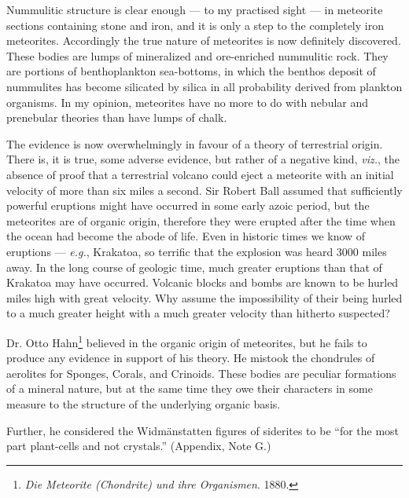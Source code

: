 \documentclass[a4paper, 12pt, oneside]{article}
\begin{document}
Nummulitic structure is clear enough --- to my practised sight --- in meteorite sections containing stone and iron, and it is only a step to the completely iron meteorites. Accordingly the true nature of meteorites is now definitely discovered. These bodies are lumps of mineralized and ore-enriched nummulitic rock. They are portions of benthoplankton sea-bottoms, in which the benthos deposit of nummulites has become silicated by silica in all probability derived from plankton organisms. In my opinion, meteorites have no more to do with nebular and prenebular theories than have lumps of chalk.

The evidence is now overwhelmingly in favour of a theory of terrestrial origin. There is, it is true, some adverse evidence, but rather of a negative kind, \emph{viz.}, the absence of proof that a terrestrial volcano could eject a meteorite with an initial velocity of more than six miles a second. Sir Robert Ball assumed that sufficiently powerful eruptions might have occurred in some early azoic period, but the meteorites are of organic origin, therefore they were erupted after the time when the ocean had become the abode of life. Even in historic times we know of eruptions --- \emph{e.g.}, Krakatoa, so terrific that the explosion was heard 3000 miles away. In the long course of geologic time, much greater eruptions than that of Krakatoa may have occurred. Volcanic blocks and bombs are known to be hurled miles high with great velocity. Why assume the impossibility of their being hurled to a much greater height with a much greater velocity than hitherto suspected?

Dr. Otto Hahn\footnote{\emph{Die Meteorite (Chondrite) und ihre Organismen}. 1880.} believed in the organic origin of meteorites, but he fails to produce any evidence in support of his theory. He mistook the chondrules of aerolites for Sponges, Corals, and Crinoids. These bodies are peculiar formations of a mineral nature, but at the same time they owe their characters in some measure to the structure of the underlying organic basis.

Further, he considered the Widmänstatten figures of siderites to be ``for the most part plant-cells and not crystals.'' (Appendix, Note G.)
\end{document}

